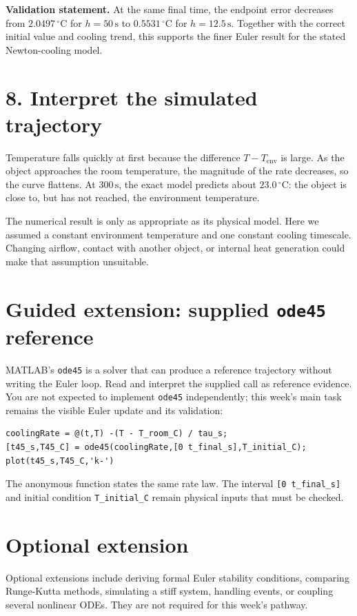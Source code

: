 \documentclass[11pt,a4paper]{article}
\newcommand{\units}[1]{\,\mathrm{#1}}
\begin{document}
\begin{checkbox}\textbf{Validation statement.} At the same final time, the endpoint error decreases from $2.0497\units{^\circ C}$ for $h=50\units{s}$ to $0.5531\units{^\circ C}$ for $h=12.5\units{s}$. Together with the correct initial value and cooling trend, this supports the finer Euler result for the stated Newton-cooling model.\end{checkbox}

\section*{8. Interpret the simulated trajectory}
Temperature falls quickly at first because the difference $T-T_{\mathrm{env}}$ is large. As the object approaches the room temperature, the magnitude of the rate decreases, so the curve flattens. At $300\units{s}$, the exact model predicts about $23.0\units{^\circ C}$: the object is close to, but has not reached, the environment temperature.

The numerical result is only as appropriate as its physical model. Here we assumed a constant environment temperature and one constant cooling timescale. Changing airflow, contact with another object, or internal heat generation could make that assumption unsuitable.

\section*{Guided extension: supplied \texttt{ode45} reference}
MATLAB's \texttt{ode45} is a solver that can produce a reference trajectory without writing the Euler loop. Read and interpret the supplied call as reference evidence. You are not expected to implement \texttt{ode45} independently; this week's main task remains the visible Euler update and its validation:
\begin{lstlisting}[style=matlabstyle,caption={Reading a supplied ode45 reference trajectory for the cooling model.}]
coolingRate = @(t,T) -(T - T_room_C) / tau_s;
[t45_s,T45_C] = ode45(coolingRate,[0 t_final_s],T_initial_C);
plot(t45_s,T45_C,'k-')
\end{lstlisting}
The anonymous function states the same rate law. The interval \texttt{[0 t\_final\_s]} and initial condition \texttt{T\_initial\_C} remain physical inputs that must be checked.

\section*{Optional extension}
Optional extensions include deriving formal Euler stability conditions, comparing Runge-Kutta methods, simulating a stiff system, handling events, or coupling several nonlinear ODEs. They are not required for this week’s pathway.
\end{document}
